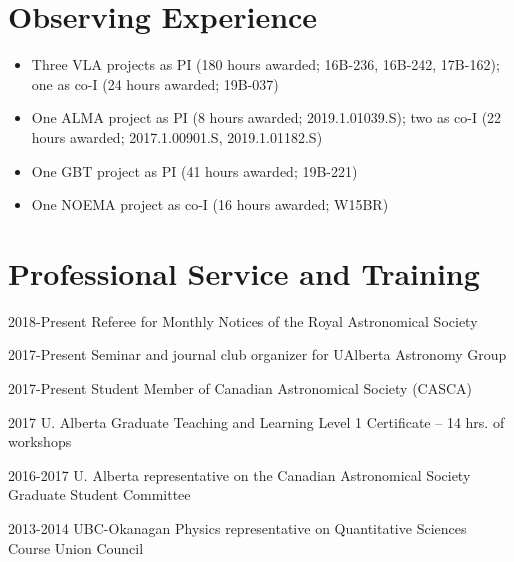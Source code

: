 \documentclass[letterpaper,11pt]{article}
\newlength{\mainindent} \setlength{\mainindent}{12pt}
\newlength{\contentindent} \setlength{\contentindent}{19ex}
\newenvironment{datelist}{
  \begingroup
  \raggedright
  \begin{description}[labelindent=\mainindent,leftmargin=\contentindent,
      style=sameline,font=\normalfont,topsep=0pt,partopsep=0pt,parsep=0pt,
      itemsep=4pt]
}{
  \end{description}
  \endgroup
}
\begin{document}


\section*{Observing Experience}
\begin{itemize}
\item Three VLA projects as PI (180 hours awarded; 16B-236, 16B-242, 17B-162); one as co-I (24 hours awarded; 19B-037)
\item One ALMA project as PI (8 hours awarded; 2019.1.01039.S); two as co-I (22 hours awarded; 2017.1.00901.S, 2019.1.01182.S)
\item One GBT project as PI (41 hours awarded; 19B-221)
\item One NOEMA project as co-I (16 hours awarded; W15BR)
\end{itemize}

\section*{Professional Service and Training}
\begin{datelist}

\item[2018-Present] Referee for Monthly Notices of the Royal Astronomical Society
\item[2017-Present] Seminar and journal club organizer for UAlberta Astronomy Group
\item[2017-Present] Student Member of Canadian Astronomical Society (CASCA)
\item[2017] U. Alberta Graduate Teaching and Learning Level 1 Certificate -- 14 hrs. of workshops
\item[2016-2017] U. Alberta representative on the Canadian Astronomical Society Graduate Student Committee
\item[2013-2014] UBC-Okanagan Physics representative on Quantitative Sciences Course Union Council

\end{datelist}
\end{document}
